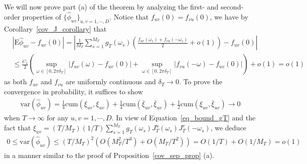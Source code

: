 \documentclass[11pt]{article}
\numberwithin{equation}{section}
\theoremstyle{plain}
\theoremstyle{definition}
\theoremstyle{definition}
\theoremstyle{assumption}
\theoremstyle{proposition}
\theoremstyle{proposition}
\theoremstyle{example}
\theoremstyle{lemma}
\theoremstyle{theorem}
\theoremstyle{remark}
\begin{document}
We will now prove part (a) of the theorem by analyzing the first- and second-order properties of $\{\hat{\phi}_{uv}\}_{u,v=1,\cdots,D}$. Notice that $f_{uv}(0)=f_{vu}(0)$, we have by Corollary~\ref{cov_J_corollary} that
\begin{align*}
&|\mathrm{E}\hat{\phi}_{uv} - f_{uv}(0)|
=\left|\frac{1}{M_T}\sum_{s=1}^{M_T}g_T(\omega_s)\left(\frac{f_{uv}(\omega_s) + f_{vu}(-\omega_s)}{2} + o(1)\right) - f_{uv}(0)\right| \\
&\leqslant \frac{C_1}{2}\left(\sup_{\omega\in[0,2\pi\delta_T]}|f_{uv}(\omega) - f_{uv}(0)| + \sup_{\omega\in[0,2\pi\delta_T]}|f_{vu}(-\omega) - f_{uv}(0)|\right) + o(1)
=o(1)
\end{align*}
as both $f_{uv}$ and $f_{vu}$ are uniformly continuous and $\delta_T\rightarrow0$. To prove the convergence in probability, it suffices to show 
\begin{align*}
\mathrm{var}(\hat{\phi}_{uv})
=\frac{1}{4}\mathrm{cum}(\xi_{uv}, \xi_{uv})
+\frac{1}{4}\mathrm{cum}(\bar{\xi}_{uv}, \bar{\xi}_{uv}) 
+\frac{1}{2}\mathrm{cum}(\xi_{uv}, \bar{\xi}_{uv})\rightarrow 0
\end{align*}
when $T\rightarrow\infty$ for any $u,v=1,\cdots,D$. In view of Equation~\eqref{eq_bound_gT} and the fact that $\xi_{uv}=(T/M_T)(1/T)\sum_{s=1}^{M_T}g_T(\omega_s)J_{T}^{u}(\omega_s)J_{T}^{v}(-\omega_s)$, we deduce
\begin{align*}
0\leqslant\mathrm{var}(\hat{\phi}_{uv})
\leqslant(T/M_T)^2 (O(M_T^2/T^3) 
+O(M_T/T^2) ) = O(1/T) + O(1/M_T) = o(1)
\end{align*}
in a manner similar to the proof of Proposition~\ref{cov_sep_prop} (a). 
\end{document}
